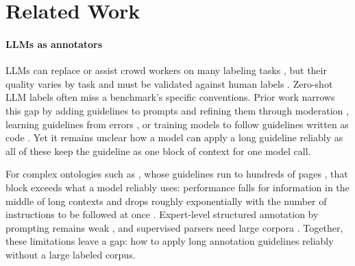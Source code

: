 \section{Related Work}
\label{sec:related}

\paragraph{LLMs as annotators}
LLMs can replace or assist crowd workers on many labeling tasks \citep{wang2021reduce,gilardi2023chatgpt,tornberg2023chatgpt,he2024annollm,ziems2024css,tan2024annotation}, but their quality varies by task and must be validated against human labels \citep{pangakis2023validation}. 
Zero-shot LLM labels often miss a benchmark's specific conventions. Prior work narrows this gap by adding guidelines to prompts and refining them through moderation \citep{kim2026refining}, learning guidelines from errors \citep{pang2023guideline}, or training models to follow guidelines written as code \citep{sainz2024gollie,wang2023code4struct}. Yet it remains unclear how a model can apply a long guideline reliably as all of these keep the guideline as one block of context for one model call. 

For complex ontologies such as \umr, whose guidelines run to hundreds of pages \citep{gysel2021design,bonn2025umr2}, that block exceeds what a model reliably uses: performance falls for information in the middle of long contexts \citep{liu2024lost} and drops roughly exponentially with the number of instructions to be followed at once \citep{harada2025instructions}. Expert-level structured annotation by prompting remains weak \citep{ettinger2023expert,sun2024chinese}, and supervised parsers need large corpora \citep{chun2024pipeline,markle2026setup}. Together, these limitations leave a gap: how to apply long annotation guidelines reliably without a large labeled corpus.

